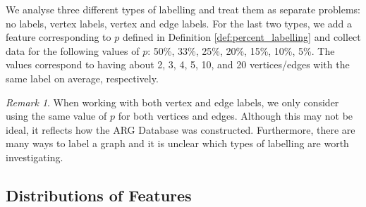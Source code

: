 \documentclass{l4proj}
\theoremstyle{definition}
\theoremstyle{remark}
\newtheorem{remark}{Remark}[section]
\begin{document}
We analyse three different types of labelling and treat them as separate
problems: no labels, vertex labels, vertex and edge labels. For the last two
types, we add a feature corresponding to $p$ defined in Definition
\ref{def:percent_labelling} and collect data for the following values of $p$:
50\%, 33\%, 25\%, 20\%, 15\%, 10\%, 5\%. The values correspond to having about
2, 3, 4, 5, 10, and 20 vertices/edges with the same label on average,
respectively.

\begin{remark} %
  When working with both vertex and edge labels, we only consider using the same
  value of $p$ for both vertices and edges. Although this may not be ideal, it
  reflects how the ARG Database was constructed. Furthermore, there are many
  ways to label a graph and it is unclear which types of labelling are worth
  investigating.
\end{remark}

\subsection{Distributions of Features}
\end{document}
